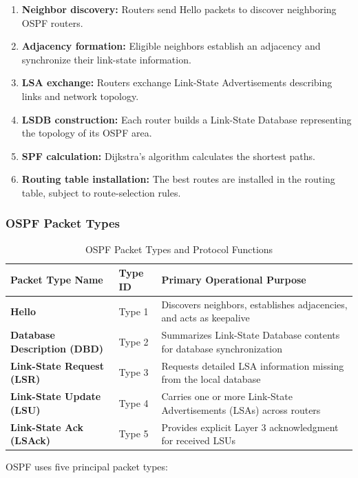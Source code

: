 \begin{enumerate}
\item \textbf{Neighbor discovery:} Routers send Hello packets to discover neighboring OSPF routers.
\item \textbf{Adjacency formation:} Eligible neighbors establish an adjacency and synchronize their link-state information.
\item \textbf{LSA exchange:} Routers exchange Link-State Advertisements describing links and network topology.
\item \textbf{LSDB construction:} Each router builds a Link-State Database representing the topology of its OSPF area.
\item \textbf{SPF calculation:} Dijkstra's algorithm calculates the shortest paths.
\item \textbf{Routing table installation:} The best routes are installed in the routing table, subject to route-selection rules.
\end{enumerate}

\subsubsection{OSPF Packet Types}
\begin{table}[htbp]
\centering
\caption{OSPF Packet Types and Protocol Functions}
\label{tab:ospf_packet_types}
\begin{tabularx}{\textwidth}{p{4.2cm} p{2.2cm} X}
\toprule
\textbf{Packet Type Name} & \textbf{Type ID} & \textbf{Primary Operational Purpose} \\
\midrule
\textbf{Hello} & Type 1 & Discovers neighbors, establishes adjacencies, and acts as keepalive \\
\textbf{Database Description (DBD)} & Type 2 & Summarizes Link-State Database contents for database synchronization \\
\textbf{Link-State Request (LSR)} & Type 3 & Requests detailed LSA information missing from the local database \\
\textbf{Link-State Update (LSU)} & Type 4 & Carries one or more Link-State Advertisements (LSAs) across routers \\
\textbf{Link-State Ack (LSAck)} & Type 5 & Provides explicit Layer 3 acknowledgment for received LSUs \\
\bottomrule
\end{tabularx}
\end{table}

OSPF uses five principal packet types:


